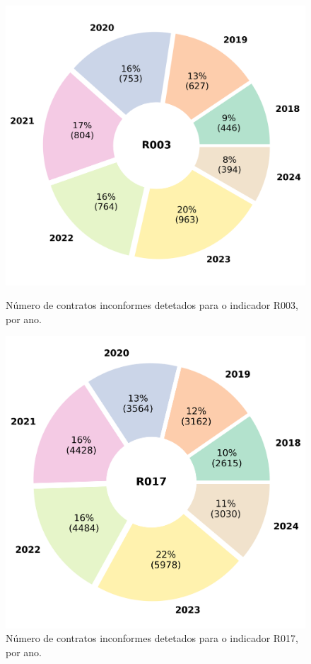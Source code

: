 \begin{figure}[H]
	\centering
	\begin{minipage}{.48\linewidth}
		\includegraphics[width=\linewidth]{imagens/final/circle_R003.png}
		\caption{Número de contratos inconformes detetados para o indicador R003, por ano.}
		\label{final2}
	\end{minipage}
	\hfill
	\begin{minipage}{.48\linewidth}
		\includegraphics[width=\linewidth]{imagens/final/circle_R017.png}
		\caption{Número de contratos inconformes detetados para o indicador R017, por ano.}
		\label{final3}
		
	\end{minipage}
\end{figure}




